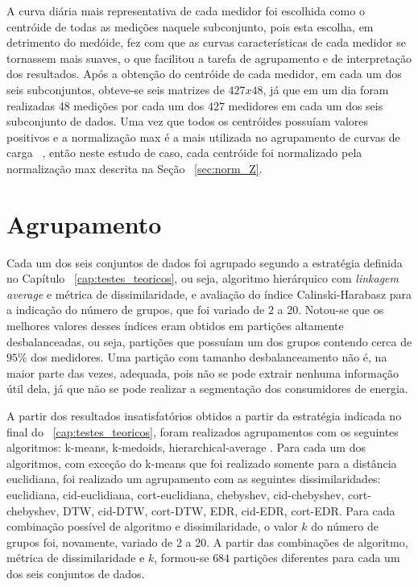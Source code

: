A curva diária mais representativa de cada medidor foi escolhida como o centróide de todas as medições naquele subconjunto, pois esta escolha, em detrimento do medóide, fez com que as curvas características de cada medidor se tornassem mais suaves, o que facilitou a tarefa de agrupamento e de interpretação dos resultados. Após a obtenção do centróide de cada medidor, em cada um dos seis subconjuntos, obteve-se seis matrizes de $427x48$, já que em um dia foram realizadas 48 medições por cada um dos $427$ medidores em cada um dos seis subconjunto de dados. Uma vez que todos os centróides possuíam valores positivos e a normalização max é a mais utilizada no agrupamento de curvas de carga ~\parencite{Chicco}, então neste estudo de caso, cada centróide foi normalizado pela normalização max descrita na Seção ~\ref{sec:norm_Z}.

\section{Agrupamento}

Cada um dos seis conjuntos de dados foi agrupado segundo a estratégia definida no Capítulo ~\ref{cap:testes_teoricos}, ou seja, algoritmo hierárquico com \emph{linkagem average} e métrica de dissimilaridade, e avaliação do índice Calinski-Harabasz para a indicação do número de grupos, que foi variado de $2$ a $20$. Notou-se que os melhores valores desses índices eram obtidos em partições altamente desbalanceadas, ou seja, partições que possuíam um dos grupos contendo cerca de $95\%$ dos medidores. Uma partição com tamanho desbalanceamento não é, na maior parte das vezes, adequada, pois não se pode extrair nenhuma informação útil dela, já que não se pode realizar a segmentação dos consumidores de energia.

A partir dos resultados insatisfatórios obtidos a partir da estratégia indicada no final do ~\ref{cap:testes_teoricos}, foram realizados agrupamentos com os seguintes algoritmos: k-means, k-medoids, hierarchical-average . Para cada um dos algoritmos, com exceção do k-means que foi realizado somente para a distância euclidiana, foi realizado um agrupamento com as seguintes dissimilaridades: euclidiana, cid-euclidiana, cort-euclidiana, chebyshev, cid-chebyshev, cort-chebyshev, DTW, cid-DTW, cort-DTW, EDR, cid-EDR, cort-EDR. Para cada combinação possível de algoritmo e dissimilaridade, o valor $k$ do número de grupos foi, novamente, variado de $2$ a $20$. A partir das combinações de algoritmo, métrica de dissimilaridade e $k$, formou-se $684$ partições diferentes para cada um dos  seis conjuntos de dados.

